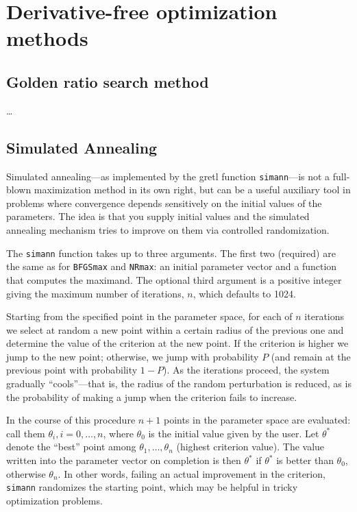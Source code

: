 \section{Derivative-free optimization methods}
\label{sec:derivfree}

\subsection{Golden ratio search method}
\label{sec:golden}

\ldots

\subsection{Simulated Annealing}
\label{sec:sim-anneal}

Simulated annealing---as implemented by the gretl function
\texttt{simann}---is not a full-blown maximization method in its own
right, but can be a useful auxiliary tool in problems where
convergence depends sensitively on the initial values of the
parameters. The idea is that you supply initial values and the
simulated annealing mechanism tries to improve on them via controlled
randomization.

The \texttt{simann} function takes up to three arguments. The first
two (required) are the same as for \texttt{BFGSmax} and
\texttt{NRmax}: an initial parameter vector and a function that
computes the maximand. The optional third argument is a positive
integer giving the maximum number of iterations, $n$, which defaults
to 1024.

Starting from the specified point in the parameter space, for each of
$n$ iterations we select at random a new point within a certain radius
of the previous one and determine the value of the criterion at the
new point. If the criterion is higher we jump to the new point;
otherwise, we jump with probability $P$ (and remain at the previous
point with probability $1-P$).  As the iterations proceed, the system
gradually ``cools''---that is, the radius of the random perturbation
is reduced, as is the probability of making a jump when the criterion
fails to increase.

In the course of this procedure $n+1$ points in the parameter space
are evaluated: call them $\theta_i, i=0,\dots,n$, where $\theta_0$ is
the initial value given by the user. Let $\theta^*$ denote the
``best'' point among $\theta_1, \dots, \theta_n$ (highest criterion
value). The value written into the parameter vector on completion is
then $\theta^*$ if $\theta^*$ is better than $\theta_0$, otherwise
$\theta_n$. In other words, failing an actual improvement in the
criterion, \texttt{simann} randomizes the starting point, which may be
helpful in tricky optimization problems.

